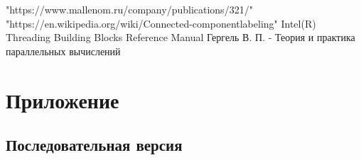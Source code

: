 \documentclass{report}
\begin{document}
\newpage
	\begin{thebibliography}{1}
		 "https://www.mallenom.ru/company/publications/321/"
		 "https://en.wikipedia.org/wiki/Connected-componentlabeling"
		 Intel(R) Threading Building Blocks Reference Manual
		 Гергель В. П. - Теория и практика параллельных вычислений
	\end{thebibliography}
	
\newpage
\section*{Приложение}
\subsection{Последовательная версия}
\end{document}
